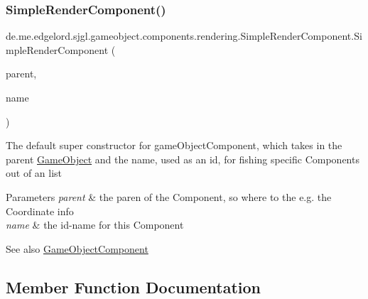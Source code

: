 \subsubsection{\texorpdfstring{Simple\+Render\+Component()}{SimpleRenderComponent()}}
{\footnotesize\ttfamily de.\+me.\+edgelord.\+sjgl.\+gameobject.\+components.\+rendering.\+Simple\+Render\+Component.\+Simple\+Render\+Component (\begin{DoxyParamCaption}\item[{\mbox{\hyperlink{classde_1_1me_1_1edgelord_1_1sjgl_1_1gameobject_1_1_game_object}{Game\+Object}}}]{parent,  }\item[{String}]{name }\end{DoxyParamCaption})}

The default super constructor for game\+Object\+Component, which takes in the parent \mbox{\hyperlink{classde_1_1me_1_1edgelord_1_1sjgl_1_1gameobject_1_1_game_object}{Game\+Object}} and the name, used as an id, for fishing specific Components out of an list


\begin{DoxyParams}{Parameters}
{\em parent} & the paren of the Component, so where to the e.\+g. the Coordinate info \\
\hline
{\em name} & the id-\/name for this Component\\
\hline
\end{DoxyParams}
\begin{DoxySeeAlso}{See also}
\mbox{\hyperlink{classde_1_1me_1_1edgelord_1_1sjgl_1_1gameobject_1_1_game_object_component}{Game\+Object\+Component}} 
\end{DoxySeeAlso}


\subsection{Member Function Documentation}
\mbox{\label{classde_1_1me_1_1edgelord_1_1sjgl_1_1gameobject_1_1components_1_1rendering_1_1_simple_render_component_a7513032b4d5bfe60626f40e7fc6234e6}} 
